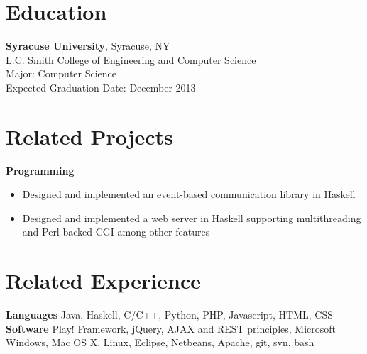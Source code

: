 \documentclass[margin]{res}
\begin{document}
 
 
 
\address{{\bf Present Address} \\ 200 Slocum Heights Apartment 2 \\ Syracuse, NY 13210  \\
        (717) 802-2485 \\ dmwils02@syr.edu}
\address{{\bf Permanent Address} \\ 124 Yorkshire Drive \\ Mechanisburg, PA 17055}

 
\begin{resume} 
 
\section{Education} 
{\bf Syracuse University}, Syracuse, NY \\
L.C. Smith College of Engineering and Computer Science \\
Major: Computer Science \\
Expected Graduation Date: December 2013

\section{Related Projects}
{\bf Programming} 
\begin{itemize} %
\item Designed and implemented an event-based communication library in Haskell
\item Designed and implemented a web server in Haskell supporting multithreading and Perl backed CGI among other features
\end{itemize}

\section{Related Experience}
 {\bf Languages} Java, Haskell, C/C++, Python, PHP, Javascript, HTML, CSS \\
 {\bf Software} Play! Framework, jQuery, AJAX and REST principles, Microsoft Windows, Mac OS X, Linux, Eclipse, Netbeans, Apache, git, svn, bash


\end{resume}
\end{document}
